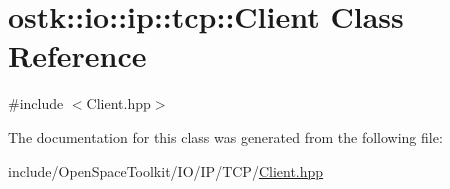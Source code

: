 \hypertarget{classostk_1_1io_1_1ip_1_1tcp_1_1_client}{}\section{ostk\+:\+:io\+:\+:ip\+:\+:tcp\+:\+:Client Class Reference}
\label{classostk_1_1io_1_1ip_1_1tcp_1_1_client}


{\ttfamily \#include $<$Client.\+hpp$>$}



The documentation for this class was generated from the following file\+:\begin{DoxyCompactItemize}
\item 
include/\+Open\+Space\+Toolkit/\+I\+O/\+I\+P/\+T\+C\+P/\hyperlink{_client_8hpp}{Client.\+hpp}\end{DoxyCompactItemize}
